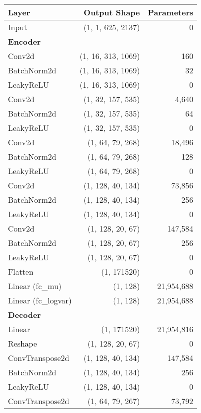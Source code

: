 \begin{table}[!h]
    \centering
    \begin{tabular}{lrr}
        \toprule
        Layer & Output Shape & Parameters \\
        \midrule
        Input & (1, 1, 625, 2137) & 0 \\
        \multicolumn{3}{l}{\textbf{Encoder}} \\
        Conv2d & (1, 16, 313, 1069) & 160 \\
        BatchNorm2d & (1, 16, 313, 1069) & 32 \\
        LeakyReLU & (1, 16, 313, 1069) & 0 \\
        Conv2d & (1, 32, 157, 535) & 4,640 \\
        BatchNorm2d & (1, 32, 157, 535) & 64 \\
        LeakyReLU & (1, 32, 157, 535) & 0 \\
        Conv2d & (1, 64, 79, 268) & 18,496 \\
        BatchNorm2d & (1, 64, 79, 268) & 128 \\
        LeakyReLU & (1, 64, 79, 268) & 0 \\
        Conv2d & (1, 128, 40, 134) & 73,856 \\
        BatchNorm2d & (1, 128, 40, 134) & 256 \\
        LeakyReLU & (1, 128, 40, 134) & 0 \\
        Conv2d & (1, 128, 20, 67) & 147,584 \\
        BatchNorm2d & (1, 128, 20, 67) & 256 \\
        LeakyReLU & (1, 128, 20, 67) & 0 \\
        Flatten & (1, 171520) & 0 \\
        Linear (fc\_mu) & (1, 128) & 21,954,688 \\
        Linear (fc\_logvar) & (1, 128) & 21,954,688 \\
        \multicolumn{3}{l}{\textbf{Decoder}} \\
        Linear & (1, 171520) & 21,954,816 \\
        Reshape & (1, 128, 20, 67) & 0 \\
        ConvTranspose2d & (1, 128, 40, 134) & 147,584 \\
        BatchNorm2d & (1, 128, 40, 134) & 256 \\
        LeakyReLU & (1, 128, 40, 134) & 0 \\
        ConvTranspose2d & (1, 64, 79, 267) & 73,792 \\

\end{tabular}
\end{table}
